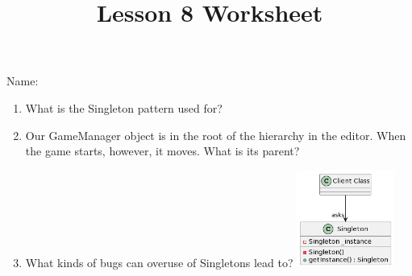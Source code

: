 \documentclass[12pt]{../rhitcsse}
\title{Lesson 8 Worksheet}
\begin{document}
\maketitle

\vspace*{0.15in}\hspace{0.25in}Name:\hrulefill\hspace{0.25in}\hspace{0.25in}

\begin{enumerate}
  \item What is the Singleton pattern used for?
  \vfill
  \item Our GameManager object is in the root of the hierarchy in the editor. 
  When the game starts, however, it moves. What is its parent?
  \vfill
  \item What kinds of bugs can overuse of Singletons lead to?
  \vfill
  \clearpage
  \centering
  \includegraphics[width=0.25\textwidth]{../figs/Singleton.png}

\end{enumerate}
\end{document}
